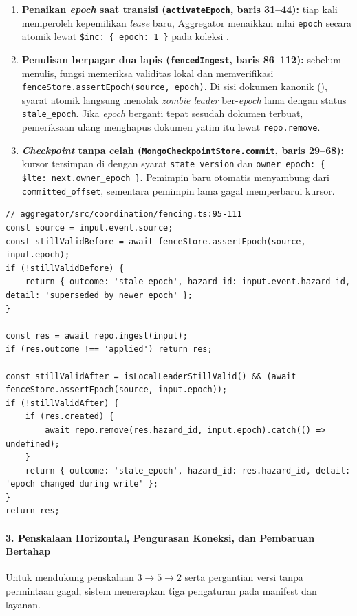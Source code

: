 \begin{enumerate}
  \item \textbf{Penaikan \textit{epoch} saat transisi (\texttt{activateEpoch}, baris 31--44):} tiap kali memperoleh kepemilikan \textit{lease} baru, Aggregator menaikkan nilai \texttt{epoch} secara atomik lewat \texttt{\$inc: \{ epoch: 1 \}} pada koleksi .
  \item \textbf{Penulisan berpagar dua lapis (\texttt{fencedIngest}, baris 86--112):} sebelum menulis, fungsi memeriksa validitas lokal dan memverifikasi \texttt{fenceStore.assertEpoch(source, epoch)}. Di sisi dokumen kanonik (), syarat atomik  langsung menolak \textit{zombie leader} ber-\textit{epoch} lama dengan status \texttt{stale\_epoch}. Jika \textit{epoch} berganti tepat sesudah dokumen terbuat, pemeriksaan ulang menghapus dokumen yatim itu lewat \texttt{repo.remove}.
  \item \textbf{\textit{Checkpoint} tanpa celah (\texttt{MongoCheckpointStore.commit}, baris 29--68):} kursor tersimpan di  dengan syarat \texttt{state\_version} dan \texttt{owner\_epoch: \{ \$lte: next.owner\_epoch \}}. Pemimpin baru otomatis menyambung dari \texttt{committed\_offset}, sementara pemimpin lama gagal memperbarui kursor.
\end{enumerate}

\begin{lstlisting}
// aggregator/src/coordination/fencing.ts:95-111
const source = input.event.source;
const stillValidBefore = await fenceStore.assertEpoch(source, input.epoch);
if (!stillValidBefore) {
    return { outcome: 'stale_epoch', hazard_id: input.event.hazard_id, detail: 'superseded by newer epoch' };
}

const res = await repo.ingest(input);
if (res.outcome !== 'applied') return res;

const stillValidAfter = isLocalLeaderStillValid() && (await fenceStore.assertEpoch(source, input.epoch));
if (!stillValidAfter) {
    if (res.created) {
        await repo.remove(res.hazard_id, input.epoch).catch(() => undefined);
    }
    return { outcome: 'stale_epoch', hazard_id: res.hazard_id, detail: 'epoch changed during write' };
}
return res;
\end{lstlisting}

\paragraph*{3. Penskalaan Horizontal, Pengurasan Koneksi, dan Pembaruan Bertahap}
Untuk mendukung penskalaan $3 \to 5 \to 2$ serta pergantian versi tanpa permintaan gagal, sistem menerapkan tiga pengaturan pada manifest dan layanan.

